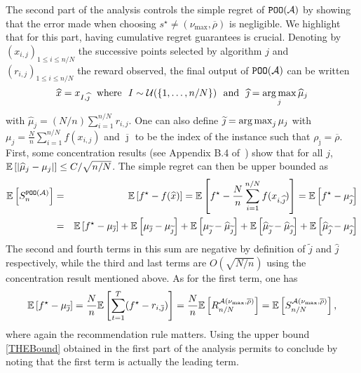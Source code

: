 The second part of the analysis controls the simple regret of $\texttt{POO}(\mathcal{A})$ by showing that the error made when choosing $s^\star \neq (\nu_{\max},\overline{\rho})$ is negligible. We highlight that for this part, having cumulative regret guarantees is crucial. Denoting by $(x_{i,j})_{1\leq i \leq n/N}$ the successive points selected by algorithm $j$ and $(r_{i,j})_{1\leq i \leq n/N}$ the reward observed, the final output of $\texttt{POO}(\mathcal{A})$ can be written \[\widehat{x} = x_{I,\widehat\jmath} \ \ \text{where} \ \ I \sim \mathcal{U}(\{1,\dots,n/N\}) \  \text{ and} \ \ \widehat\jmath = \operatorname*{arg\,max}_{j} \widehat{\mu}_j\] with $\hat{\mu}_j = (N/n)\sum_{i=1}^{n/N} r_{i,j}$. One can also define $\widetilde\jmath = \operatorname*{arg\,max}_{j} \mu_j$ with $\mu_j =\frac{N}{n}\sum_{i=1}^{n/N} f(x_{i,j})$ and $\overline{\jmath}$ to be the index of the instance such that $\rho_{\overline{\jmath}} = \overline{\rho}$. First, some concentration results (see Appendix B.4 of~\citealt{grill2015poo}) show that for all $j$, $\mathbb{E}\left[|\widehat{\mu}_{j} - \mu_j|\right] \leq C/\sqrt{n/N}$. The simple regret can then be upper bounded as 
\begin{eqnarray*}
 \mathbb{E}\left[S_n^{\texttt{POO}(\mathcal{A})}\right] & = & \mathbb{E}\left[f^\star - f(\widehat{x})\right] = \mathbb{E}\left[f^\star - \frac{N}{n}\sum_{i=1}^{n/N}f(x_{i,\widehat{\jmath}})\right] = \mathbb{E}\left[f^\star - \mu_{\widehat\jmath}\right]\\
 & = & \mathbb{E}\left[f^\star - \mu_{\overline{\jmath}}\right] + \mathbb{E}\left[\mu_{\overline{\jmath}} - \mu_{\widetilde{\jmath}}\right] + \mathbb{E}\left[\mu_{\widetilde{\jmath}} - \widehat{\mu}_{\widetilde{\jmath}}\right] + \mathbb{E}\left[\widehat{\mu}_{\widetilde{\jmath}}-\widehat{\mu}_{\widehat{\jmath}}\right]
+ \mathbb{E}\left[\widehat{\mu}_{\widehat{\jmath}} - \mu_{\widehat{\jmath}}\right]\end{eqnarray*}
The second and fourth terms in this sum are negative by definition of $\tilde{j}$ and $\hat{j}$ respectively, while the third and last terms are $O(\sqrt{{N}/{n}})$ using the concentration result mentioned above. As for the first term, one has 
\[\mathbb{E}\left[f^\star - \mu_{\overline{\jmath}}\right] = \frac{N}{n}\mathbb{E}\left[\sum_{t=1}^T (f^\star - r_{i,\overline{\jmath}})\right] = \frac{N}{n} \mathbb{E}\left[R_{n/N}^{\mathcal{A}(\nu_{\max},\overline{\rho})}\right] = \mathbb{E}\left[S_{n/N}^{\mathcal{A}(\nu_{\max},\overline{\rho})}\right],\]
where again the recommendation rule matters. Using the upper bound \eqref{THEBound} obtained in the first part of the analysis permits to conclude by noting that the first term is actually the leading term. 
